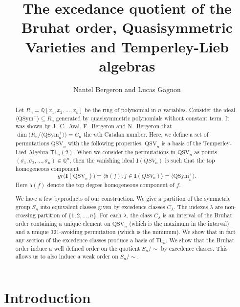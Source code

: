 \documentclass[12pt]{amsart}
\title{The excedance quotient of the Bruhat order, Quasisymmetric Varieties and Temperley-Lieb algebras}
\author{ Nantel Bergeron and Lucas Gagnon}
\date{}
\theoremstyle{definition}
\theoremstyle{remark}
\numberwithin{equation}{section}
\newcommand{\QQ}{\mathbb{Q}}
\newcommand{\TL}{\mathsf{TL}}
\newcommand{\QSym}{\mathrm{QSym}}
\newcommand{\QSV}{\mathrm{QSV}}
\begin{document}
\maketitle
\begin{abstract} Let $R_n=\QQ[x_1,x_2,\ldots,x_n]$ be the ring of polynomial in $n$ variables. Consider the ideal $\langle \QSym^+\rangle\subseteq R_n$ generated by quasisymmetric polynomials
without constant term. It was shown by J.~C.~Aval, F.~Bergeron and  N.~Bergeron that $\dim\big(R_n\big/\langle \QSym_{n}^{+} \rangle\big)=C_n$ the $n$th Catalan number. Here, we define a set of permutations $\QSV_n$ with the following properties. $\QSV_n$ is a basis of the Temperley-Lied Algebra $\TL_n(2)$. When we consider the permutations in $\QSV_n$ as points $(\sigma_1,\sigma_2,\ldots,\sigma_n)\in\QQ^n$, 
then the vanishing ideal $ \mathbf{I}(QSV_n)$ is such that the top homogeneous component 
$$gr\big(\mathbf{I}(\QSV_n)\big)=\big\langle \mathsf{h}(f): f\in \mathbf{I}(QSV_n)\big\rangle=\big\langle \QSym_{n}^{+} \big\rangle.$$ 
Here  $\mathsf{h}(f)$ denote the top degree homogeneous component of $f$.

We have a few byproducts of our construction. We give a partition of the symmetric group $S_n$ into equivalent classes given by excedence classes $C_\lambda$. The indexes $\lambda$ are non-crossing partition of $\{1,2,\ldots,n\}$. For each $\lambda$, the class $C_\lambda$ is an interval of the Bruhat order containing a unique element on $\QSV_n$ (which is the maximum in the interval) and a unique $321$-avoiding permutation (which is the minimum). We show that in fact any section of the excedence classes produce a basis of $\TL_n$. We show that the Bruhat order induce a well defined order on the quotient $S_n\big/\!\!\sim$ by excedence classes. This allows us to also induce a weak order on $S_n\big/\!\!\sim$.
\end{abstract}

\section{Introduction}
\end{document}
